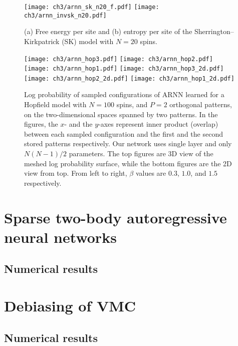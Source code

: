 \begin{figure}[htb]
\centering
\texttt{[image: ch3/arnn\_sk\_n20\_f.pdf]}
\texttt{[image: ch3/arnn\_invsk\_n20.pdf]}
\caption[ARNN results of Sherrington--Kirkpatrick model]{
(a) Free energy per site and (b) entropy per site of the Sherrington--Kirkpatrick (SK) model with $N = 20$ spins.
}
\label{fig:arnn-sk}
\end{figure}

\begin{figure}[htb]
\centering
\texttt{[image: ch3/arnn\_hop3.pdf]}
\texttt{[image: ch3/arnn\_hop2.pdf]}
\texttt{[image: ch3/arnn\_hop1.pdf]}
\texttt{[image: ch3/arnn\_hop3\_2d.pdf]}
\texttt{[image: ch3/arnn\_hop2\_2d.pdf]}
\texttt{[image: ch3/arnn\_hop1\_2d.pdf]}
\caption[ARNN results of Hopfield model]{
Log probability of sampled configurations of ARNN learned for a Hopfield model with $N = 100$ spins, and $P = 2$ orthogonal patterns, on the two-dimensional spaces spanned by two patterns. In the figures, the $x$- and the $y$-axes represent inner product (overlap) between each sampled configuration and the first and the second stored patterns respectively. Our network uses single layer and only $N (N - 1) / 2$ parameters. The top figures are 3D view of the meshed log probability surface, while the bottom figures are the 2D view from top. From left to right, $\beta$ values are $0.3$, $1.0$, and $1.5$ respectively.
}
\label{fig:arnn-hop}
\end{figure}

\section{Sparse two-body autoregressive neural networks}

\cite{biazzo2024sparse}

\subsection{Numerical results}

\section{Debiasing of VMC}
\label{sec:ncus}

\cite{wu2021unbiased}

\subsection{Numerical results}
